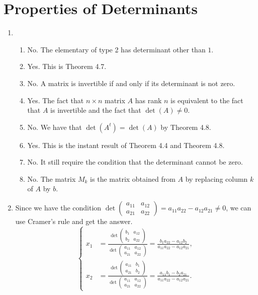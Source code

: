 \section{Properties of Determinants}
\begin{enumerate}
\item \begin{enumerate}
\item No. The elementary of type 2 has determinant other than $1$.
\item Yes. This is Theorem 4.7.
\item No. A matrix is invertible if and only if its determinant is not zero.
\item Yes. The fact that $n\times n$ matrix $A$ has rank $n$ is equivalent to the fact that $A$ is invertible and the fact that $\det(A)\neq 0$.
\item No. We have that $\det(A^t)=\det(A)$ by Theorem 4.8.
\item Yes. This is the instant result of Theorem 4.4 and Theorem 4.8.
\item No. It still require the condition that the determinant cannot be zero.
\item No. The matrix $M_k$ is the matrix obtained from $A$ by replacing column $k$ of $A$ by $b$.
\end{enumerate}
\item Since we have the condition $\det\begin{pmatrix}a_{11}&a_{12}\\a_{21}&a_{22}\end{pmatrix}=a_{11}a_{22}-a_{12}a_{21}\neq 0$, we can use Cramer's rule and get the answer.
\[\left\{\begin{array}{cc}
x_1&=\frac{\det\begin{pmatrix}b_1&a_{12}\\b_2&a_{22}\end{pmatrix}}{\det\begin{pmatrix}a_{11}&a_{12}\\a_{21}&a_{22}\end{pmatrix}}=\frac{b_1a_{22}-a_{12}b_2}{a_{11}a_{22}-a_{12}a_{21}},\\
x_2&=\frac{\det\begin{pmatrix}a_{11}&b_1\\a_{21}&b_2\end{pmatrix}}{\det\begin{pmatrix}a_{11}&a_{12}\\a_{21}&a_{22}\end{pmatrix}}=\frac{a_{11}b_1-b_2a_{21}}{a_{11}a_{22}-a_{12}a_{21}}.

\end{array}\]
\end{enumerate}
